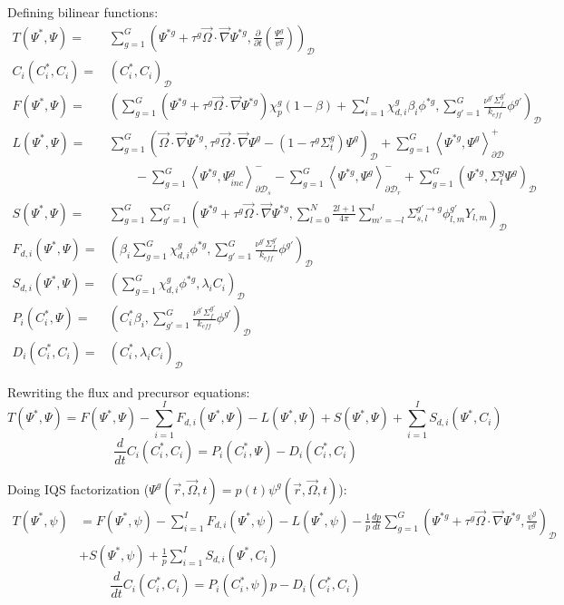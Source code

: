 \documentclass[11pt]{tamurmemo}
\newcommand{\grad}{\vec{\nabla}}
\newcommand{\be}{\begin{equation}}
\newcommand{\ee}{\end{equation}}
\newcommand{\kef}{\ensuremath{k_{\textit{eff}}}}
\newcommand{\keff}{\kef\xspace}
\newcommand{\vo}{\vec{\Omega}}
\newcommand{\vr}{\vec{r}}
\newcommand{\qq}{\quad\quad}
\newcommand{\D}{\ensuremath{\mathcal{D}}}
\begin{document}
Defining bilinear functions:
\begin{align}
T(\Psi^{*},\Psi) =& \sum_{g=1}^G\left(\Psi^{*g}+\tau^g\vo\cdot\grad\Psi^{*g},\frac{\partial}{\partial t}\left(\frac{\Psi^g}{v^g}\right)\right)_\D \\
C_i(C_i^*,C_i) =& \left(C_i^*,C_i\right)_\D \\
F(\Psi^{*},\Psi) =& \left(\sum_{g=1}^G\left(\Psi^{*g}+\tau^g\vo\cdot\grad\Psi^{*g}\right)\chi_p^g(1-\beta)+\sum_{i=1}^I\chi_{d,i}^g\beta_i\phi^{*g},\sum_{g'=1}^G \frac{\nu^{g'} \Sigma_f^{g'}}{\keff} \phi^{g'}\right)_\D \\
L(\Psi^{*},\Psi) =& \sum_{g=1}^G\left(\vo\cdot\grad\Psi^{*g}, \tau^g\vo\cdot\grad\Psi^g - (1 - \tau^g\Sigma_t^g)\Psi^g\right)_\D + \sum_{g=1}^G\left\langle\Psi^{*g},\Psi^{g}\right\rangle_{\partial \D}^+ \nonumber \\
& \qq - \sum_{g=1}^G\left\langle\Psi^{*g},\Psi^{g}_{inc}\right\rangle_{\partial \D_s}^- - \sum_{g=1}^G\left\langle\Psi^{*g},\Psi^{g}\right\rangle_{\partial \D_r}^- + \sum_{g=1}^G\left(\Psi^{*g},\Sigma_t^g\Psi^g\right)_\D \\
S(\Psi^{*},\Psi) =& \sum_{g=1}^G\sum_{g'=1}^G\left(\Psi^{*g}+\tau^g\vo\cdot\grad\Psi^{*g},\sum_{l=0}^N \frac{2l+1}{4\pi}\sum_{m'=-l}^l\Sigma_{s,l}^{g'\to g} \phi^{g'}_{l,m}Y_{l,m}\right)_\D \\
F_{d,i}(\Psi^*,\Psi) =& \left(\beta_i\sum_{g=1}^G\chi_{d,i}^g\phi^{*g},\sum_{g'=1}^G\frac{\nu^{g'} \Sigma_f^{g'}}{\keff}\phi^{g'}\right)_\D \\
S_{d,i}(\Psi^*,\Psi) =& \left(\sum_{g=1}^G\chi_{d,i}^g\phi^{*g},\lambda_i C_i\right)_\D \\
P_i(C^*_i,\Psi) = & \left(C^*_i\beta_i,\sum_{g'=1}^G\frac{\nu^{g'} \Sigma_f^{g'}}{\keff}\phi^{g'}\right)_\D \\
D_i(C^*_i,C_i) =& \left(C_i^*,\lambda_i C_i\right)_\D
\end{align}

Rewriting the flux and precursor equations:
\be
T(\Psi^{*},\Psi) = F(\Psi^{*},\Psi) - \sum_{i=1}^I F_{d,i}(\Psi^{*},\Psi) - L(\Psi^{*},\Psi) + S(\Psi^{*},\Psi) + \sum_{i=1}^I S_{d,i}(\Psi^*,C_i)
\ee
\be
\frac{d}{dt}C_i(C_i^*,C_i) = P_i(C_i^*,\Psi) - D_i(C_i^*,C_i)
\ee

Doing IQS factorization ($\Psi^g(\vr,\vo,t) = p(t)\psi^g(\vr,\vo,t)$):
\begin{align}
T(\Psi^{*},\psi) &= F(\Psi^{*},\psi) - \sum_{i=1}^I F_{d,i}(\Psi^*,\psi) - L(\Psi^{*},\psi) - \frac{1}{p}\frac{dp}{dt}\sum_{g=1}^G\left(\Psi^{*g}+\tau^g\vo\cdot\grad\Psi^{*g},\frac{\psi^g}{v^g}\right)_\D \nonumber \\
& + S(\Psi^{*},\psi) + \frac{1}{p}\sum_{i=1}^I S_{d,i}(\Psi^*,C_i)
\label{eq:shape1}
\end{align}
\be
\frac{d}{dt}C_i(C_i^*,C_i) = P_i(C_i^*,\psi)p - D_i(C_i^*,C_i)
\label{eq:cshape1}
\ee
\end{document}
